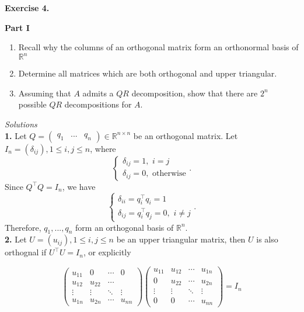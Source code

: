 \textbf{Exercise 4.} 

\begin{center}
    \textbf{Part I}
\end{center}

\begin{enumerate}
    \item Recall why the columns of an orthogonal matrix form an orthonormal basis of $\mathbb{R}^n$
    \item Determine all matrices which are both orthogonal and upper triangular. 
    \item Assuming that $A$ admits a $QR$ decomposition, show that there are $2^n$ possible $QR$ decompositions for $A$.
\end{enumerate}

\textit{Solutions}\\

\textbf{1. } Let $Q=\begin{pmatrix}
    q_1 & ... & q_n
\end{pmatrix}\in\mathbb{R}^{n\times n}$ be an orthogonal matrix. Let $I_n=(\delta_{ij}),1\le i,j\le n$, where 
$$\begin{cases}
    \delta_{ij}=1,\,\,i=j\\
    \delta_{ij}=0,\,\,\text{otherwise}
\end{cases}.$$ Since $Q^\top Q=I_n$, we have 
$$\begin{cases}
    \delta_{ii}=q_i^\top q_i = 1\\
    \delta_{ij}=q_i^\top q_j = 0,\,\,i\ne j
\end{cases}.$$
Therefore, $q_1,...,q_n$ form an orthogonal basis of $\mathbb{R}^n$.\\

\textbf{2.} Let $U=(u_{ij}),1\le i,j\le n$ be an upper triangular matrix, then $U$ is also orthognal if $U^\top U = I_n$, or explicitly

$$\begin{pmatrix}
    u_{11} & 0  & \cdots & 0\\
    u_{12} & u_{22} & \cdots & \\
    \vdots & \vdots & \ddots & \vdots\\
    u_{1n} &  u_{2n} &   \cdots    & u_{nn}
\end{pmatrix}
\begin{pmatrix}
    u_{11} & u_{12} & \cdots & u_{1n}\\
    0      & u_{22} & \cdots & u_{2n}\\
    \vdots & \vdots & \ddots & \vdots\\
    0      &  0     & \cdots & u_{nn}
\end{pmatrix}=I_n$$

